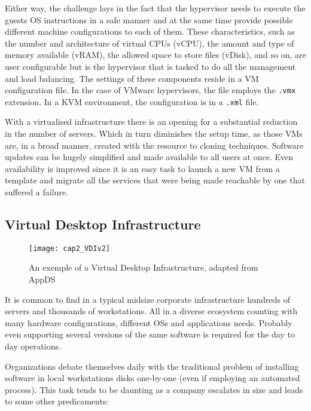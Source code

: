 Either way, the challenge lays in the fact that the hypervisor needs to execute the guests OS instructions in a safe manner and at the same time provide possible different machine configurations to each of them. These characteristics, such as the number and architecture of virtual CPUs (vCPU), the amount and type of memory available (vRAM), the allowed space to store files (vDisk), and so on, are user configurable but is the hypervisor that is tasked to do all the management and load balancing. The settings of these components reside in a VM configuration file. In the case of VMware hypervisors, the file employs the \texttt{.vmx} extension.\cite{VMWare_VMFiles,Portnoy2012} In a KVM environment, the configuration is in a \texttt{.xml} file.~\cite{chirammal2016}

With a virtualised infrastructure there is an opening for a substantial reduction in the number of servers. Which in turn diminishes the setup time, as those VMs are, in a broad manner, created with the resource to cloning techniques. Software updates can be hugely simplified and made available to all users at once. Even availability is improved since it is an easy task to launch a new VM from a template and migrate all the services that were being made reachable by one that suffered a failure.




\subsection{Virtual Desktop Infrastructure} %
\label{sub:vdi}

\begin{figure}[htbp]
	\centering
	\texttt{[image: cap2\_VDIv2]}
	\caption{An exemple of a Virtual Desktop Infrastructure, adapted from AppDS~\cite{appds_2017}}
	\label{fig:VDI}
\end{figure}

It is common to find in a typical midsize corporate infrastructure hundreds of servers and thousands of workstations. All in a diverse ecosystem counting with many hardware configurations, different OSs and applications needs. Probably even supporting several versions of the same software is required for the day to day operations.

Organizations debate themselves daily with the traditional problem of installing software in local workstations disks one-by-one (even if employing an automated process). This task tends to be daunting as a company escalates in size and leads to some other predicaments:


